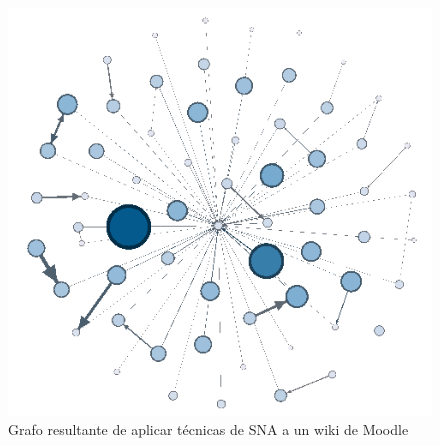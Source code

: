 \begin{figure}[h]
  \begin{center}
    \includegraphics[scale=0.5]{SNA-Grafo-Wiki-SD.png}
  \end{center}
  \caption{Grafo resultante de aplicar técnicas de SNA a un wiki de Moodle}
  \label{fig:SNAWiki}
\end{figure}

